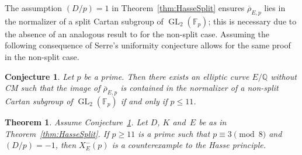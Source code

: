 \documentclass[12pt]{amsart}
\numberwithin{equation}{section}
\newtheorem{theorem}[equation]{Theorem}
\newtheorem{conj}[equation]{Conjecture}
\theoremstyle{definition}
\newcommand{\F}{\mathbb{F}}
\newcommand{\Q}{\mathbb{Q}}
\newcommand{\rhobar}{{\overline{\rho}}}
\newcommand{\Xp}{X_E^{-}(p)}
\DeclareMathOperator{\GL}{GL}
\begin{document}
The assumption $(D/p) = 1$ in Theorem~\ref{thm:HasseSplit} ensures $\rhobar_{E,p}$ lies in the normalizer of a split Cartan subgroup of $\GL_2(\F_p)$; this is necessary due to the absence of an analogous result to \cite[Theorem 1.2]{Xsplit13} for the non-split case. Assuming the following consequence of Serre's uniformity conjecture allows for the same proof in the non-split case.

\begin{conj}\label{conj:nonsplit}
Let $p$ be a prime.
Then there exists an elliptic curve $E/\Q$ without CM such that
the image of $\rhobar_{E,p}$ is contained in the normalizer of a non-split Cartan subgroup
of $\GL_2(\F_p)$ if and only if $p \leq 11$.
\end{conj}

\begin{theorem} \label{thm:HasseNonSplit} Assume Conjecture~\ref{conj:nonsplit}.
Let $D$, $K$ and~$E$ be as in Theorem~\ref{thm:HasseSplit}.
If $p \geq 11$ is a prime such that $p \equiv 3 \pmod{8}$ and $(D / p) = -1$, then $\Xp$ is a counterexample to the Hasse principle.
\end{theorem}
\end{document}
